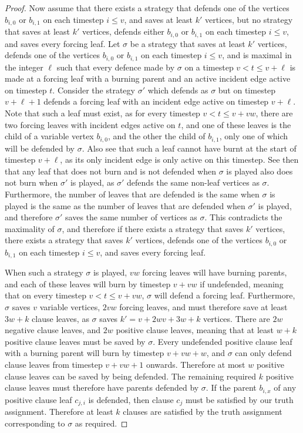 \documentclass[a4paper,UKenglish,cleveref, autoref, thm-restate]{lipics-v2021} %
\begin{document}
\begin{toappendix}
\begin{proof}
Now assume that there exists a strategy that defends one of the vertices $b_{i,0}$ or $b_{i,1}$ on each timestep $i \leq v$, and saves at least $k'$ vertices, but no strategy that saves at least $k'$ vertices, defends either $b_{i,0}$ or $b_{i,1}$ on each timestep $i \leq v$, and saves every forcing leaf. Let $\sigma$ be a strategy that saves at least $k'$ vertices, defends one of the vertices $b_{i,0}$ or $b_{i,1}$ on each timestep $i \leq v$, and is maximal in the integer $\ell$ such that every defence made by $\sigma$ on a timestep $v < t \leq v + \ell$ is made at a forcing leaf with a burning parent and an active incident edge active on timestep $t$. Consider the strategy $\sigma'$ which defends as $\sigma$ but on timestep $v+\ell+1$ defends a forcing leaf with an incident edge active on timestep $v + \ell$. Note that such a leaf must exist, as for every timestep $v < t \leq v+vw$, there are two forcing leaves with incident edges active on $t$, and one of these leaves is the child of a variable vertex $b_{i,0}$, and the other the child of $b_{i,1}$, only one of which will be defended by $\sigma$. Also see that such a leaf cannot have burnt at the start of timestep $v + \ell$, as its only incident edge is only active on this timestep. See then that any leaf that does not burn and is not defended when $\sigma$ is played also does not burn when $\sigma'$ is played, as $\sigma'$ defends the same non-leaf vertices as $\sigma$. Furthermore, the number of leaves that are defended is the same when $\sigma$ is played is the same as the number of leaves that are defended when $\sigma'$ is played, and therefore $\sigma'$ saves the same number of vertices as $\sigma$. This contradicts the maximality of $\sigma$, and therefore if there exists a strategy that saves $k'$ vertices, there exists a strategy that saves $k'$ vertices, defends one of the vertices $b_{i,0}$ or $b_{i,1}$ on each timestep $i \leq v$, and saves every forcing leaf.

When such a strategy $\sigma$ is played, $vw$ forcing leaves will have burning parents, and each of these leaves will burn by timestep $v+vw$ if undefended, meaning that on every timestep $v < t \leq v+vw$, $\sigma$ will defend a forcing leaf. Furthermore, $\sigma$ saves $v$ variable vertices, $2vw$ forcing leaves, and must therefore save at least $3w+k$ clause leaves, as $\sigma$ saves $k'=v+2wv+3w+k$ vertices. There are $2w$ negative clause leaves, and $2w$ positive clause leaves, meaning that at least $w+k$ positive clause leaves must be saved by $\sigma$. Every undefended positive clause leaf with a burning parent will burn by timestep $v+vw+w$, and $\sigma$ can only defend clause leaves from timestep $v+vw+1$ onwards. Therefore at most $w$ positive clause leaves can be saved by being defended. The remaining required $k$ positive clause leaves must therefore have parents defended by $\sigma$. If the parent $b_{i,x}$ of any positive clause leaf $c_{j,i}$ is defended, then clause $c_j$ must be satisfied by our truth assignment. Therefore at least $k$ clauses are satisfied by the truth assignment corresponding to $\sigma$ as required.
\end{proof}


\end{toappendix}
\end{document}
